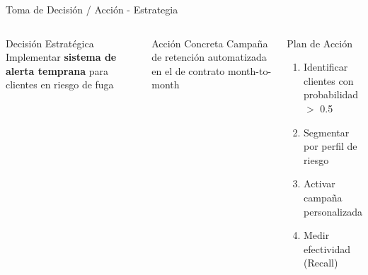 
\begin{frame}{Toma de Decisión / Acción - Estrategia}
    \begin{columns}[t]
        \begin{block}{Decisión Estratégica}
            \centering
            Implementar \textbf{sistema de alerta temprana} para clientes en riesgo de fuga
        \end{block}
        
        \begin{exampleblock}{Acción Concreta}
            Campaña de retención automatizada en el  de contrato month-to-month
        \end{exampleblock}
        
        \begin{actionblock}{Plan de Acción}
            \begin{enumerate}
                \item Identificar clientes con probabilidad $>$ 0.5
                \item Segmentar por perfil de riesgo
                \item Activar campaña personalizada
                \item Medir efectividad (Recall)
            \end{enumerate}
        \end{actionblock}
    \end{columns}
\end{frame}

